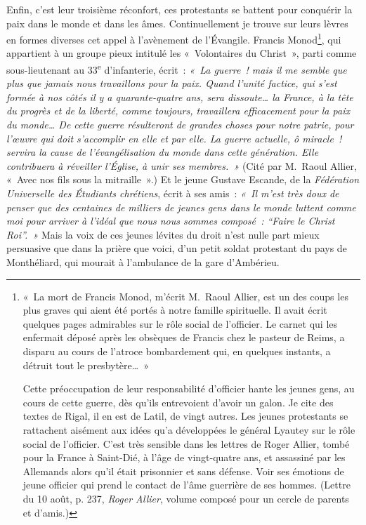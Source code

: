 \documentclass[french,twoside]{book} %
\begin{document}
Enfin, c’est leur troisième réconfort, ces protestants se battent pour conquérir la paix dans le monde et dans les âmes. Continuellement je trouve sur leurs lèvres en formes diverses cet appel à l’avènement de l’Évangile. Francis Monod\footnote{\noindent « La mort de Francis Monod, m’écrit M. Raoul Allier, est un des coups les plus graves qui aient été portés à notre famille spirituelle. Il avait écrit quelques pages admirables sur le rôle social de l’officier. Le carnet qui les enfermait déposé après les obsèques de Francis chez le pasteur de Reims, a disparu au cours de l’atroce bombardement qui, en quelques instants, a détruit tout le presbytère… »‌
\par
 \noindent Cette préoccupation de leur responsabilité d’officier hante les jeunes gens, au cours de cette guerre, dès qu’ils entrevoient d’avoir un galon. Je cite des textes de Rigal, il en est de Latil, de vingt autres. Les jeunes protestants se rattachent aisément aux idées qu’a développées le général Lyautey sur le rôle social de l’officier. C’est très sensible dans les lettres de Roger Allier, tombé pour la France à Saint-Dié, à l’âge de vingt-quatre ans, et assassiné par les Allemands alors qu’il était prisonnier et sans défense. Voir ses émotions de jeune officier qui prend le contact de l’âme guerrière de ses hommes. (Lettre du 10 août, p. 237, {\itshape Roger Allier}, volume composé pour un cercle de parents et d’amis.)
 }, qui appartient à un groupe pieux intitulé les « Volontaires du Christ », parti comme sous-lieutenant au 33\textsuperscript{e} d’infanterie, écrit : \emph{« La guerre ! mais il me semble que plus que jamais nous travaillons pour la paix. Quand l’unité factice, qui s’est formée à nos côtés il y a quarante-quatre ans, sera dissoute… la France, à la tête du progrès et de la liberté, comme toujours, travaillera efficacement pour la paix du monde… De cette guerre résulteront de grandes choses pour notre patrie, pour l’œuvre qui doit s’accomplir en elle et par elle. La guerre actuelle, ô miracle ! servira la cause de l’évangélisation du monde dans cette génération. Elle contribuera à réveiller l’Église, à unir ses membres. »} (Cité par M. Raoul Allier, « Avec nos fils sous la mitraille ».) Et le jeune Gustave Escande, de la {\itshape Fédération Universelle des Étudiants chrétiens}, écrit à ses amis : \emph{« Il m’est très doux de penser que des centaines de milliers de jeunes gens dans le monde luttent comme moi pour arriver à l’idéal que nous nous sommes composé : “Faire le Christ Roi”. »} Mais la voix de ces jeunes lévites du droit n’est nulle part mieux persuasive que dans la prière que voici, d’un petit soldat protestant du pays de Monthéliard, qui mourait à l’ambulance de la gare d’Ambérieu.\par
\end{document}
